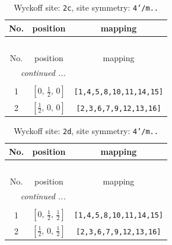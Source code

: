 \documentclass[fleqn,8pt]{jsarticle}
\begin{document}
\renewcommand{\arraystretch}{1.2}
\begin{longtable}{ccc}
\caption{Wyckoff site: {\tt 2c}, site symmetry: {\tt 4'/m..}}
 \\
 \hline \hline
No. & position & mapping \\ \hline \endfirsthead

\multicolumn{2}{l}{\tablename\ \thetable{}} \\
 \hline \hline
No. & position & mapping \\ \hline \endhead

 \hline \hline
\multicolumn{2}{r}{\footnotesize\it continued ...} \\ \endfoot

 \hline \hline
\multicolumn{2}{r}{} \\ \endlastfoot

1 & $\left[ 0,\, \frac{1}{2},\, 0 \right]$ & {\tt [1,4,5,8,10,11,14,15]} \\ \hline
2 & $\left[ \frac{1}{2},\, 0,\, 0 \right]$ & {\tt [2,3,6,7,9,12,13,16]} \\
\end{longtable}
\renewcommand{\arraystretch}{1.2}
\begin{longtable}{ccc}
\caption{Wyckoff site: {\tt 2d}, site symmetry: {\tt 4'/m..}}
 \\
 \hline \hline
No. & position & mapping \\ \hline \endfirsthead

\multicolumn{2}{l}{\tablename\ \thetable{}} \\
 \hline \hline
No. & position & mapping \\ \hline \endhead

 \hline \hline
\multicolumn{2}{r}{\footnotesize\it continued ...} \\ \endfoot

 \hline \hline
\multicolumn{2}{r}{} \\ \endlastfoot

1 & $\left[ 0,\, \frac{1}{2},\, \frac{1}{2} \right]$ & {\tt [1,4,5,8,10,11,14,15]} \\ \hline
2 & $\left[ \frac{1}{2},\, 0,\, \frac{1}{2} \right]$ & {\tt [2,3,6,7,9,12,13,16]} \\
\end{longtable}
\renewcommand{\arraystretch}{1.2}
\end{document}
